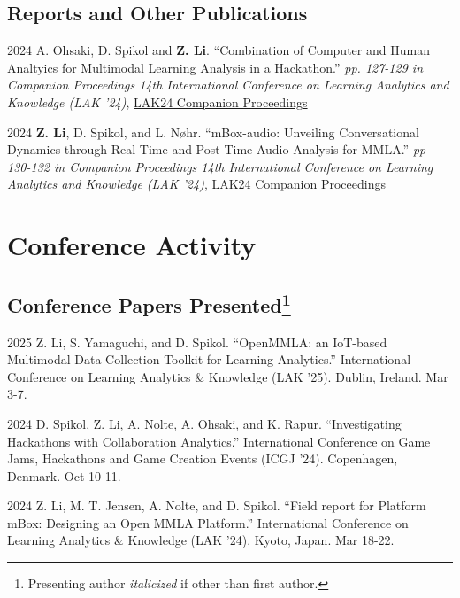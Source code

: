 \documentclass[11pt,letterpaper]{report}
\begin{document}
    \subsection*{Reports and Other Publications}

    \begin{tablist}
        \item[2024] \tab{} A. Ohsaki, D. Spikol and \textbf{Z. Li}. \enquote{Combination of Computer and Human Analtyics for Multimodal Learning Analysis in a Hackathon.} \textit{pp. 127-129 in Companion Proceedings 14th International Conference on Learning Analytics and Knowledge (LAK '24)}, \href{https://www.solaresearch.org/wp-content/uploads/2024/03/LAK24_CompanionProceedings.pdf}{LAK24 Companion Proceedings}
        \item[2024] \tab{} \textbf{Z. Li}, D. Spikol, and L. Nøhr. \enquote{mBox-audio: Unveiling Conversational Dynamics through Real-Time and Post-Time Audio Analysis for MMLA.} \textit{pp 130-132 in Companion Proceedings 14th International Conference on Learning Analytics and Knowledge (LAK '24)}, \href{https://www.solaresearch.org/wp-content/uploads/2024/03/LAK24_CompanionProceedings.pdf}{LAK24 Companion Proceedings}
    \end{tablist}


    \section*{Conference Activity}

    \subsection*{Conference Papers Presented\footnote{Presenting author \textit{italicized} if other than first author.}}

    \begin{tablist}
        \item[2025] \tab{}Z. Li, S. Yamaguchi, and D. Spikol. \enquote{OpenMMLA: an IoT-based Multimodal Data Collection Toolkit for Learning Analytics.} International Conference on Learning Analytics & Knowledge (LAK '25). Dublin, Ireland. Mar 3-7.
        \item[2024] \tab{}D. Spikol, Z. Li, A. Nolte, A. Ohsaki, and K. Rapur. \enquote{Investigating Hackathons with Collaboration Analytics.} International Conference on Game Jams, Hackathons and Game Creation Events (ICGJ '24). Copenhagen, Denmark. Oct 10-11.
        \item[2024] \tab{}Z. Li, M. T. Jensen, A. Nolte, and D. Spikol. \enquote{Field report for Platform mBox: Designing an Open MMLA Platform.} International Conference on Learning Analytics & Knowledge (LAK '24). Kyoto, Japan. Mar 18-22.
    \end{tablist}
\end{document}
